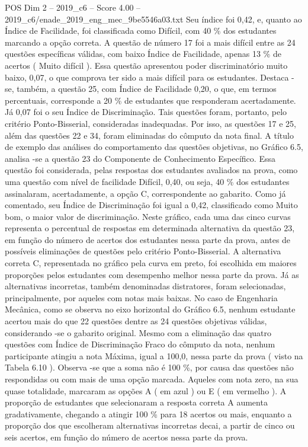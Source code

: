 \begin{textsample}{POS Dim 2 – 2019\_c6 – Score 4.00 – 2019\_c6/enade\_2019\_eng\_mec\_9be5546a03.txt}
Seu índice foi 0,42, e, quanto ao Índice de Facilidade, foi classificada como Difícil, com 40 \% dos estudantes marcando a opção correta.
A questão de número 17 foi a mais difícil entre as 24 questões específicas válidas, com baixo Índice de Facilidade, apenas 13 \% de acertos ( Muito difícil ).
Essa questão apresentou poder discriminatório muito baixo, 0,07, o que comprova ter sido a mais difícil para os estudantes.
Destaca -se, também, a questão 25, com Índice de Facilidade 0,20, o que, em termos percentuais, corresponde a 20 \% de estudantes que responderam acertadamente.
Já 0,07 foi o seu Índice de Discriminação.
Tais questões foram, portanto, pelo critério Ponto-Bisserial, consideradas inadequadas.
Por isso, as questões 17 e 25, além das questões 22 e 34, foram eliminadas do cômputo da nota final.
A título de exemplo das análises do comportamento das questões objetivas, no Gráfico 6.5, analisa -se a questão 23 do Componente de Conhecimento Específico.
Essa questão foi considerada, pelas respostas dos estudantes avaliados na prova, como uma questão com nível de facilidade Difícil, 0,40, ou seja, 40 \% dos estudantes assinalaram, acertadamente, a opção C, correspondente ao gabarito.
Como já comentado, seu Índice de Discriminação foi igual a 0,42, classificado como Muito bom, o maior valor de discriminação.
Neste gráfico, cada uma das cinco curvas representa o percentual de respostas em determinada alternativa da questão 23, em função do número de acertos dos estudantes nessa parte da prova, antes de possíveis eliminações de questões pelo critério Ponto-Bisserial.
A alternativa correta C, representada no gráfico pela curva em preto, foi escolhida em maiores proporções pelos estudantes com desempenho melhor nessa parte da prova.
Já as alternativas incorretas, também denominadas distratores, foram selecionadas, principalmente, por aqueles com notas mais baixas.
No caso de Engenharia Mecânica, como se observa no eixo horizontal do Gráfico 6.5, nenhum estudante acertou mais do que 22 questões dentre as 24 questões objetivas válidas, considerando -se o gabarito original.
Mesmo com a eliminação das quatro questões com Índice de Discriminação Fraco do cômputo da nota, nenhum participante atingiu a nota Máxima, igual a 100,0, nessa parte da prova ( visto na Tabela 6.10 ).
Observa -se que a soma não é 100 \%, por causa das questões não respondidas ou com mais de uma opção marcada.
Aqueles com nota zero, na sua quase totalidade, marcaram as opções A ( em azul ) ou E ( em vermelho ).
A proporção de estudantes que selecionaram a resposta correta A aumenta gradativamente, chegando a atingir 100 \% para 18 acertos ou mais, enquanto a proporção dos que escolheram alternativas incorretas decai, a partir de cinco ou seis acertos, em função do número de acertos nessa parte da prova.

\end{textsample}
